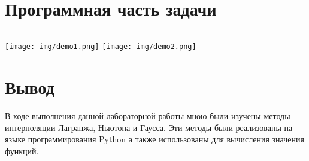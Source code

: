 \documentclass{article}
\begin{document}
\section{Программная часть задачи}
\inputminted[breaklines]{Python}{../solution/solution.py}

\begin{center}
\texttt{[image: img/demo1.png]}
\texttt{[image: img/demo2.png]}
\end{center}

\section{Вывод}
В ходе выполнения данной лабораторной работы мною были изучены
методы интерполяции Лагранжа, Ньютона и Гаусса.
Эти методы были реализованы на языке программирования Python
а также использованы для вычисления значения функций.
\end{document}
